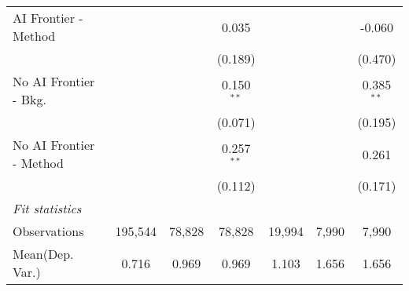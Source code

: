 \begin{tabular}{lcccccc}
   AI Frontier - Method    &               &               & 0.035         &               &             & -0.060\\   
                           &               &               & (0.189)       &               &             & (0.470)\\   
   No AI Frontier - Bkg.   &               &               & 0.150$^{**}$  &               &             & 0.385$^{**}$\\   
                           &               &               & (0.071)       &               &             & (0.195)\\   
   No AI Frontier - Method &               &               & 0.257$^{**}$  &               &             & 0.261\\   
                           &               &               & (0.112)       &               &             & (0.171)\\   
   \midrule
   \emph{Fit statistics}\\
   Observations            & 195,544       & 78,828        & 78,828        & 19,994        & 7,990       & 7,990\\  
Mean(Dep. Var.) & 0.716 & 0.969 & 0.969 & 1.103 & 1.656 & 1.656 \\
   

\end{tabular}

